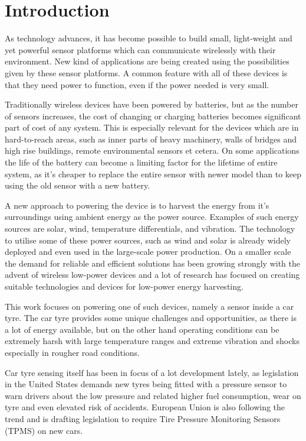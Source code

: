 \section{Introduction}

\thispagestyle{empty}

As technology advances, it has become possible to build small, light-weight and yet powerful sensor platforms which can communicate wirelessly with their environment. New kind of applications are being created using the possibilities given by these sensor platforms. A common feature with all of these devices is that they need power to function, even if the power needed is very small. 

Traditionally wireless devices have been powered by batteries, but as the number of sensors increases, the cost of changing or charging batteries becomes significant part of cost of any system. This is especially relevant for the devices which are in hard-to-reach areas, such as inner parts of heavy machinery, walls of bridges and high rise buildings, remote environmental sensors et cetera. On some applications the life of the battery can become a limiting factor for the lifetime of entire system, as it's cheaper to replace the entire sensor with newer model than to keep using the old sensor with a new battery. 

A new approach to powering the device is to harvest the energy from it's surroundings using ambient energy as the power source. Examples of such energy sources are solar, wind, temperature differentials, and vibration. The technology to utilise some of these power sources, such as wind and solar is already widely deployed and even used in the large-scale power production. On a smaller scale the demand for reliable and efficient solutions has been growing strongly with the advent of wireless low-power devices and a lot of research has focused on creating suitable technologies and devices for low-power energy harvesting. 

This work focuses on powering one of such devices, namely a sensor inside a car tyre. The car tyre provides some unique challenges and opportunities, as there is a lot of energy available, but on the other hand operating conditions can be extremely harsh with large temperature ranges and extreme vibration and shocks especially in rougher road conditions.

Car tyre sensing itself has been in focus of a lot development lately, as legislation in the United States demands new tyres being fitted with a pressure sensor to warn drivers about the low pressure and related higher fuel consumption, wear on tyre and even elevated risk of accidents. European Union is also following the trend and is drafting legislation to require Tire Pressure Monitoring Sensors (TPMS) on new cars. 


